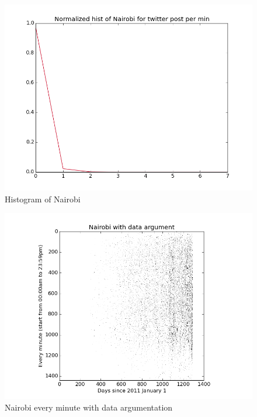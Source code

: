 \documentclass[a4paper,12pt]{article}
\begin{document}
 
  \begin{figure}[H]
  \begin{center}
      \includegraphics[scale=0.8]{Nairobihisto.png}
\end{center}
\caption{Histogram of Nairobi}
 \label {fig:2}
 \end{figure}
 
 
  \begin{figure}[H]
  \begin{center}
      \includegraphics[scale=0.8]{Nairobibinary.png}
\end{center}
\caption{Nairobi every minute with data argumentation}
 \label {fig:2}
 \end{figure}
 
\end{document}

